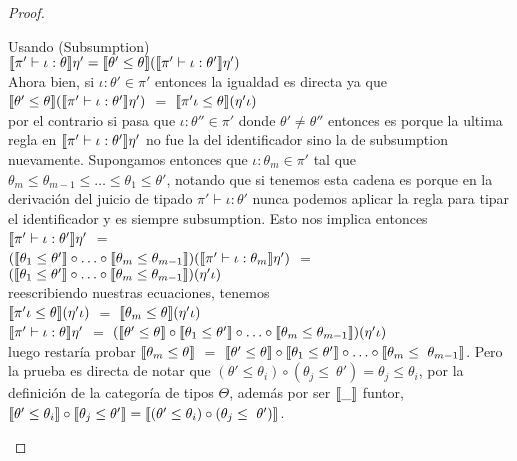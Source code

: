 \begin{proof}
\begin{itemize}
\begin{itemize}
Usando (Subsumption)\\

$\llbracket \pi' \vdash \iota : \theta \rrbracket\eta' = 
\llbracket \theta' \leq \theta \rrbracket (\llbracket \pi' \vdash \iota : \theta' \rrbracket\eta')$\\

Ahora bien, si $\iota:\theta' \in \pi'$ entonces la igualdad es directa ya que\\

$\llbracket \theta' \leq \theta \rrbracket (\llbracket \pi' \vdash \iota : \theta' \rrbracket\eta')$ $=$
$\llbracket \pi'\iota \leq \theta \rrbracket (\eta'\iota)$\\

por el contrario si pasa que $\iota:\theta'' \in \pi'$ donde $\theta' \neq \theta''$
entonces es porque la ultima regla en $\llbracket \pi' \vdash \iota : \theta' \rrbracket\eta'$
no fue la del identificador sino la de subsumption nuevamente. Supongamos entonces
que $\iota:\theta_m \in \pi'$ tal que 
$\theta_m \leq \theta_{m-1} \leq \ldots \leq \theta_1 \leq \theta'$, notando que
si tenemos esta cadena es porque en la derivaci\'on del juicio de tipado 
$\pi' \vdash \iota : \theta'$ nunca podemos aplicar la regla para tipar el identificador
y es siempre subsumption. Esto nos implica entonces\\

$\llbracket \pi' \vdash \iota : \theta' \rrbracket\eta'$ $=$\\
$(\llbracket \theta_1 \leq \theta' \rrbracket \circ 
\ldots 
\circ \llbracket \theta_m \leq \theta_{m-1} \rrbracket)
		(\llbracket \pi' \vdash \iota : \theta_m \rrbracket\eta')$ $=$\\
$(\llbracket \theta_1 \leq \theta' \rrbracket \circ 
\ldots 
\circ \llbracket \theta_m \leq \theta_{m-1} \rrbracket)(\eta'\iota)$\\

reescribiendo nuestras ecuaciones, tenemos\\

$\llbracket \pi'\iota \leq \theta \rrbracket(\eta' \iota)$ $=$ 
$\llbracket \theta_m \leq \theta \rrbracket(\eta' \iota)$\\

$\llbracket \pi' \vdash \iota : \theta \rrbracket\eta'$ $=$
$(\llbracket \theta' \leq \theta \rrbracket \circ 
\llbracket \theta_1 \leq \theta' \rrbracket \circ 
\ldots 
\circ \llbracket \theta_m \leq \theta_{m-1} \rrbracket)(\eta'\iota)$\\

luego restar\'ia probar $\llbracket \theta_m \leq \theta \rrbracket$ $=$
$\llbracket \theta' \leq \theta \rrbracket \circ 
\llbracket \theta_1 \leq \theta' \rrbracket \circ 
\ldots 
\circ \llbracket \theta_m \leq ~ \theta_{m-1} \rrbracket$.
Pero la prueba es directa de notar que 
$(\theta' \leq \theta_i) \circ (\theta_j \leq ~ \theta') = \theta_j \leq \theta_i$,
por la definici\'on de la categor\'ia de tipos $\Theta$, adem\'as
por ser $\llbracket \_ \rrbracket$ funtor, 
$\llbracket \theta' \leq \theta_i \rrbracket \circ \llbracket \theta_j \leq \theta' \rrbracket = 
\llbracket (\theta' \leq \theta_i) \circ (\theta_j \leq ~ \theta') \rrbracket$.


\end{itemize}
\end{itemize}
\end{proof}
